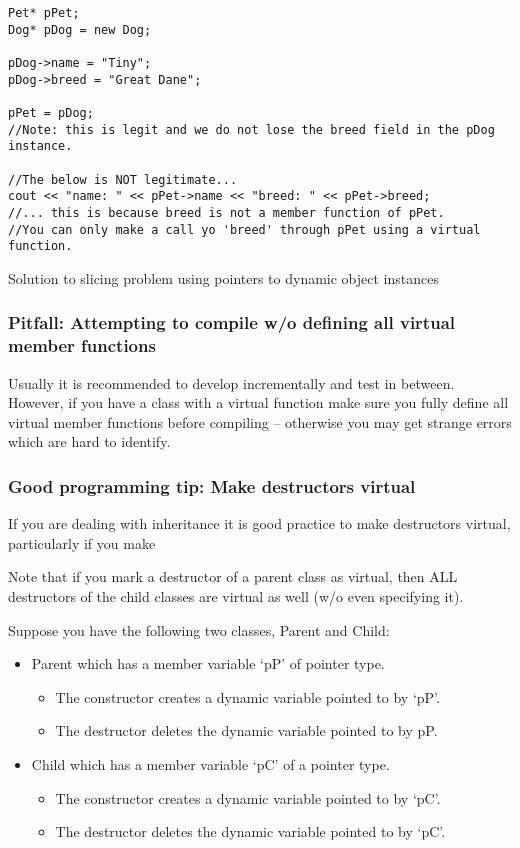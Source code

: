 \begin{listing}[H]
\begin{verbatim}
Pet* pPet;
Dog* pDog = new Dog;

pDog->name = "Tiny";
pDog->breed = "Great Dane";

pPet = pDog;
//Note: this is legit and we do not lose the breed field in the pDog instance.

//The below is NOT legitimate...
cout << "name: " << pPet->name << "breed: " << pPet->breed;
//... this is because breed is not a member function of pPet.
//You can only make a call yo 'breed' through pPet using a virtual function.
\end{verbatim}
\caption{Solution to slicing problem using pointers to dynamic object instances}
\label{source_code_1}
\end{listing}


\subsubsection*{Pitfall: Attempting to compile w/o defining all virtual member functions}
Usually it is recommended to develop incrementally and test in between. However, if you
have a class with a virtual function make sure you fully define all virtual member functions
before compiling -- otherwise you may get strange errors which are hard to identify.



\subsubsection*{Good programming tip: Make destructors virtual}
If you are dealing with inheritance it is good practice to make destructors virtual, particularly
if you make

Note that if you mark a destructor of a parent class as virtual, then ALL destructors of the
child classes are virtual as well (w/o even specifying it).

Suppose you have the following two classes, Parent and Child:
\begin{itemize}
	\item Parent which has a member variable `pP' of pointer type.
	\begin{itemize}
		\item The constructor creates a dynamic variable pointed to by `pP'.
		\item The destructor deletes the dynamic variable pointed to by pP.
	\end{itemize}
	\item Child which has a member variable `pC' of a pointer type.
	\begin{itemize}
		\item The constructor creates a dynamic variable pointed to by `pC'.
		\item The destructor deletes the dynamic variable pointed to by `pC'.
	\end{itemize}
\end{itemize}


